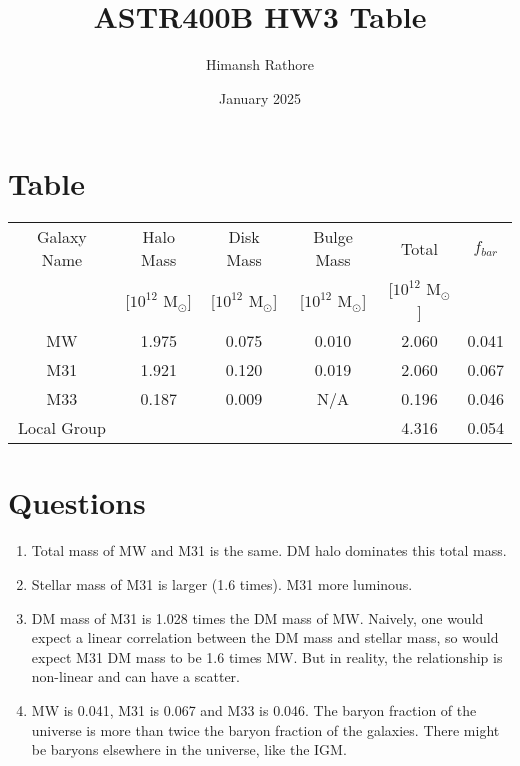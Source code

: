 \documentclass{article}
\title{ASTR400B HW3 Table}
\author{Himansh Rathore}
\date{January 2025}
\begin{document}
\maketitle

\section{Table}

\begin{tabular}{|c|c|c|c|c|c|}
    \hline
    Galaxy Name & Halo Mass & Disk Mass & Bulge Mass & Total & $f_{bar}$\\
    & [$10^{12}$ M$_\odot$] & [$10^{12}$ M$_\odot$] & [$10^{12}$ M$_\odot$] & [$10^{12}$ M$_\odot$] & \\
    \hline
    MW & 1.975 & 0.075 & 0.010 & 2.060 & 0.041 \\
    M31 & 1.921 & 0.120 & 0.019 & 2.060 & 0.067 \\
    M33 & 0.187 & 0.009 & N/A & 0.196 & 0.046 \\
    \hline
    Local Group & & & & 4.316 & 0.054 \\
    \hline
\end{tabular}

\section{Questions}

\begin{enumerate}
    \item Total mass of MW and M31 is the same. DM halo dominates this total mass.
    \item Stellar mass of M31 is larger (1.6 times). M31 more luminous.
    \item DM mass of M31 is 1.028 times the DM mass of MW. Naively, one would expect a linear correlation between the DM mass and stellar mass, so would expect M31 DM mass to be 1.6 times MW. But in reality, the relationship is non-linear and can have a scatter.
    \item MW is 0.041, M31 is 0.067 and M33 is 0.046. The baryon fraction of the universe is more than twice the baryon fraction of the galaxies. There might be baryons elsewhere in the universe, like the IGM.
\end{enumerate}
\end{document}
